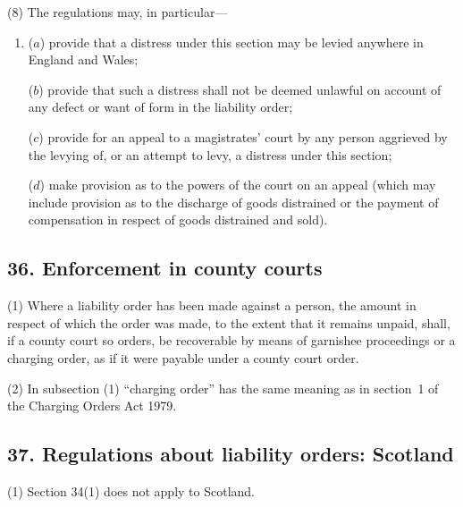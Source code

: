 \documentclass[12pt,a4paper]{article}
\begin{document}
(8) The regulations may, in particular—
\begin{enumerate}\item[]
($a$) provide that a distress under this section may be levied anywhere in England and Wales;

($b$) provide that such a distress shall not be deemed unlawful on account of any defect or want of form in the liability order;

($c$) provide for an appeal to a magistrates' court by any person aggrieved by the levying of, or an attempt to levy, a distress under this section;

($d$) make provision as to the powers of the court on an appeal (which may include provision as to the discharge of goods distrained or the payment of compensation in respect of goods distrained and sold).
\end{enumerate}


\subsection{36. Enforcement in county courts}

(1) Where a liability order has been made against a person, the amount in respect of which the order was made, to the extent that it remains unpaid, shall, if a county court so orders, be recoverable by means of garnishee proceedings or a charging order, as if it were payable under a county court order.

(2) In subsection (1)  “charging order” has the same meaning as in section~1 of the Charging Orders Act 1979.


\subsection{37. Regulations about liability orders: Scotland}

(1) Section 34(1)  does not apply to Scotland.

%
\end{document}
